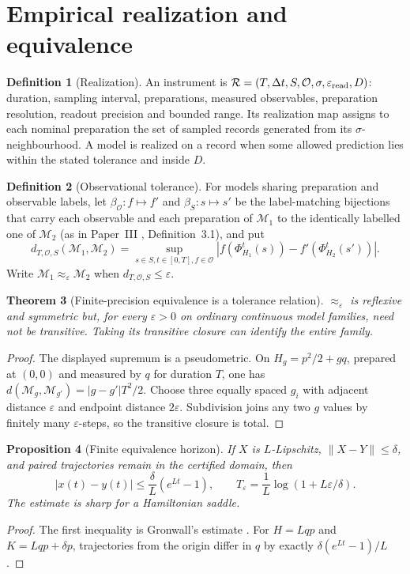 \documentclass[12pt,a4paper]{article}
\theoremstyle{definition}
\newtheorem{definition}{Definition}[section]
\theoremstyle{plain}
\newtheorem{proposition}[definition]{Proposition}
\newtheorem{theorem}[definition]{Theorem}
\theoremstyle{commentary}
\newcommand{\Oc}{\mathcal O}
\newcommand{\Mc}{\mathcal M}
\newcommand{\Rc}{\mathcal R}
\newcommand{\eps}{\varepsilon}
\begin{document}
\section{Empirical realization and equivalence}

\begin{definition}[Realization]\label{def:real}
An instrument is $\Rc=(T,\Delta t,S,\Oc,\sigma,\eps_{\rm read},D)$: duration, sampling
interval, preparations, measured observables, preparation resolution, readout precision and
bounded range.  Its realization map assigns to each nominal preparation the set of sampled
records generated from its $\sigma$-neighbourhood.  A model is realized on a record when some
allowed prediction lies within the stated tolerance and inside $D$.
\end{definition}

\begin{definition}[Observational tolerance]\label{def:tol}
For models sharing preparation and observable labels, let $\beta_\Oc:f\mapsto f'$ and
$\beta_S:s\mapsto s'$ be the label-matching bijections that carry each observable and each
preparation of $\Mc_1$ to the identically labelled one of $\Mc_2$ (as in Paper~III
\cite{PilotIII}, Definition~3.1), and put
\[
d_{T,\Oc,S}(\Mc_1,\Mc_2)=\sup_{s\in S,t\in[0,T],f\in\Oc}
 |f(\Phi^t_{H_1}(s))-f'(\Phi^t_{H_2}(s'))|.
\]
Write $\Mc_1\approx_\eps\Mc_2$ when $d_{T,\Oc,S}\le\eps$.
\end{definition}

\begin{theorem}[Finite-precision equivalence is a tolerance relation]\label{thm:tolerance}
$\approx_\eps$ is reflexive and symmetric but, for every $\eps>0$ on ordinary continuous
model families, need not be transitive.  Taking its transitive closure can identify the entire
family.
\end{theorem}
\begin{proof}
The displayed supremum is a pseudometric.  On $H_g=p^2/2+gq$, prepared at $(0,0)$ and
measured by $q$ for duration $T$, one has
$d(\Mc_g,\Mc_{g'})=|g-g'|T^2/2$.  Choose three equally spaced $g_i$ with adjacent distance
$\eps$ and endpoint distance $2\eps$.  Subdivision joins any two $g$ values by finitely many
$\eps$-steps, so the transitive closure is total.
\end{proof}

\begin{proposition}[Finite equivalence horizon]\label{prop:horizon}
If $X$ is $L$-Lipschitz, $\|X-Y\|\le\delta$, and paired trajectories remain in the certified
domain, then
\[
 |x(t)-y(t)|\le \frac{\delta}{L}(e^{Lt}-1),\qquad
 T_\eps=\frac{1}{L}\log(1+L\eps/\delta).
\]
The estimate is sharp for a Hamiltonian saddle.
\end{proposition}
\begin{proof}
The first inequality is Gronwall's estimate \cite{Gronwall1919}.  For
$H=Lqp$ and $K=Lqp+\delta p$, trajectories from the origin differ in $q$ by exactly
$\delta(e^{Lt}-1)/L$.
\end{proof}
\end{document}
